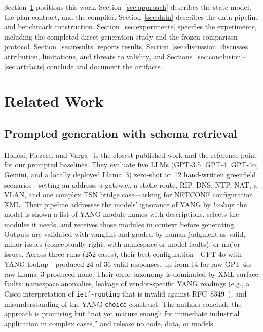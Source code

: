 \documentclass[conference]{IEEEtran}
\begin{document}
Section~\ref{sec:related} positions this work. Section~\ref{sec:approach} describes the state model, the plan contract, and the compiler. Section~\ref{sec:data} describes the data pipeline and benchmark construction. Section~\ref{sec:experiments} specifies the experiments, including the completed direct-generation study and the frozen comparison protocol. Section~\ref{sec:results} reports results, Section~\ref{sec:discussion} discusses attribution, limitations, and threats to validity, and Sections~\ref{sec:conclusion}--\ref{sec:artifacts} conclude and document the artifacts.

\section{Related Work}
\label{sec:related}

\subsection{Prompted generation with schema retrieval}

Holl\'osi, Ficzere, and Varga~\cite{hollosi2024netconf} is the closest published work and the reference point for our prompted baselines. They evaluate five LLMs (GPT-3.5, GPT-4, GPT-4o, Gemini, and a locally deployed Llama~3) zero-shot on 12 hand-written greenfield scenarios---setting an address, a gateway, a static route, RIP, DNS, NTP, NAT, a VLAN, and one complex TSN bridge case---asking for NETCONF configuration XML. Their pipeline addresses the models' ignorance of YANG by \emph{lookup}: the model is shown a list of YANG module names with descriptions, selects the modules it needs, and receives those modules in context before generating. Outputs are validated with yanglint and graded by human judgment as valid, minor issues (conceptually right, with namespace or model faults), or major issues. Across three runs (252 cases), their best configuration---GPT-4o with YANG lookup---produced 24 of 36 valid responses, up from 14 for raw GPT-4o; raw Llama~3 produced none. Their error taxonomy is dominated by XML surface faults: namespace anomalies, leakage of vendor-specific YANG readings (e.g., a Cisco interpretation of \texttt{ietf-routing} that is invalid against RFC~8349~\cite{rfc8349}), and misunderstanding of the YANG \texttt{choice} construct. The authors conclude the approach is promising but ``not yet mature enough for immediate industrial application in complex cases,'' and release no code, data, or models.
\end{document}
